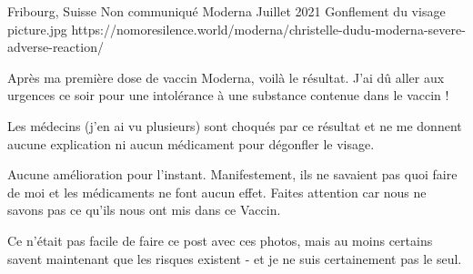 {Fribourg, Suisse}
{Non communiqué}
{Moderna}
{Juillet 2021}
{Gonflement du visage}
{picture.jpg}
{https://nomoresilence.world/moderna/christelle-dudu-moderna-severe-adverse-reaction/}
{

Après ma première dose de vaccin Moderna, voilà le résultat. J'ai dû aller aux
urgences ce soir pour une intolérance à une substance contenue dans le vaccin !

Les médecins (j'en ai vu plusieurs) sont choqués par ce résultat et ne me
donnent aucune explication ni aucun médicament pour dégonfler le visage.

Aucune amélioration pour l'instant. Manifestement, ils ne savaient pas quoi
faire de moi et les médicaments ne font aucun effet. Faites attention car nous
ne savons pas ce qu'ils nous ont mis dans ce Vaccin.

Ce n'était pas facile de faire ce post avec ces photos, mais au moins certains
savent maintenant que les risques existent - et je ne suis certainement pas le
seul.

}
